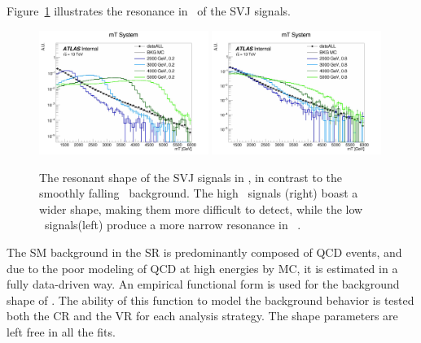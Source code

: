 Figure~\ref{fig:mt_mass} illustrates the resonance in \mt~of the SVJ signals.
\begin{figure}[!htbp]
\centering
    \includegraphics[width=0.49\textwidth]{figures/ch8/mt_mass_lowrinv}
    \includegraphics[width=0.49\textwidth]{figures/ch8/mt_mass_highrinv}
    \caption{The resonant shape of the SVJ signals in \mt, in contrast to the smoothly falling \mt~background. The high \rinv~signals (right) boast a wider shape, making them more difficult to detect, while the low \rinv~signals(left) produce a more narrow resonance in \mt~. 
    \label{fig:mt_mass}}
\end{figure}

The SM background in the SR is predominantly composed of QCD events, and due to the poor modeling of QCD at high energies by MC, it is estimated in a fully data-driven way. 
An empirical functional form is used for the background shape of \mt.
The ability of this function to model the background behavior is tested both the CR and the VR for each analysis strategy. The shape parameters are left free in all the fits.

